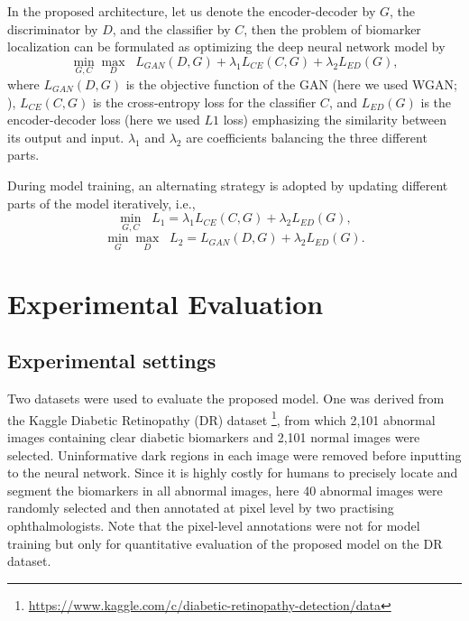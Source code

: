 \documentclass[runningheads]{llncs}
\begin{document}
In the proposed architecture, let us denote the encoder-decoder by $G$, the discriminator by $D$, and the classifier by $C$, then the problem of biomarker localization can be formulated as optimizing the deep neural network model by 
\begin{equation} 
\min_{G, C} \max_D \;\; L_{GAN}(D,G) + \lambda_1 L_{CE}(C,G) + \lambda_2 L_{ED}(G),
\end{equation}
where $L_{GAN}(D,G)$ is the objective function of the GAN (here we used WGAN; \cite{arjovsky2017wasserstein}), $L_{CE}(C,G)$ is the cross-entropy loss for the classifier $C$, and $L_{ED}(G)$ is the encoder-decoder loss (here we used $L1$ loss) emphasizing the similarity between its output and input. $\lambda_1$ and $\lambda_2$ are coefficients balancing the three different parts.

During model training, an alternating  strategy is adopted by updating different parts of the model iteratively, i.e.,
\begin{equation}
\min_{G, C} \;\; L_{1}=\lambda_1 L_{CE}(C,G) + \lambda_2 L_{ED}(G),
\end{equation}
\begin{equation}
\min_{G} \max_D \;\; L_{2}= L_{GAN}(D,G) + \lambda_2 L_{ED}(G).
\end{equation}


\section{Experimental Evaluation}
\subsection{Experimental settings}
Two datasets were used to evaluate the proposed model. One was derived from the Kaggle Diabetic Retinopathy (DR) dataset \footnote{\url{https://www.kaggle.com/c/diabetic-retinopathy-detection/data}}, from which 2,101 abnormal images containing clear diabetic biomarkers and 2,101 normal images were selected. Uninformative dark regions in each image were removed before inputting to the neural network. Since it is highly costly for humans to precisely locate and segment the biomarkers in all abnormal images, here 40 abnormal images were randomly selected and then annotated at pixel level by two practising ophthalmologists. Note that the pixel-level annotations were not for model training but only for quantitative evaluation of the proposed model on the DR dataset. 
\end{document}
